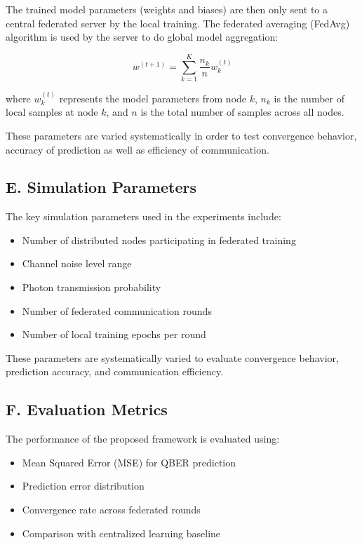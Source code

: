 \documentclass[conference]{IEEEtran}
\begin{document}
The trained model parameters (weights and biases) are then only sent to a central federated server by the local training. The federated averaging (FedAvg) algorithm is used by the server to do global model aggregation:

\[
w^{(t+1)} = \sum_{k=1}^{K} \frac{n_k}{n} w_k^{(t)}
\]

where $w_k^{(t)}$ represents the model parameters from node $k$, $n_k$ is the number of local samples at node $k$, and $n$ is the total number of samples across all nodes.

These parameters are varied systematically in order to test convergence behavior, accuracy of prediction as well as efficiency of communication. 

\subsection*{E. Simulation Parameters}

The key simulation parameters used in the experiments include:

\begin{itemize}
\item Number of distributed nodes participating in federated training
\item Channel noise level range
\item Photon transmission probability
\item Number of federated communication rounds
\item Number of local training epochs per round
\end{itemize}

These parameters are systematically varied to evaluate convergence behavior, prediction accuracy, and communication efficiency.

\subsection*{F. Evaluation Metrics}

The performance of the proposed framework is evaluated using:

\begin{itemize}
\item Mean Squared Error (MSE) for QBER prediction
\item Prediction error distribution
\item Convergence rate across federated rounds
\item Comparison with centralized learning baseline
\end{itemize}
\end{document}
